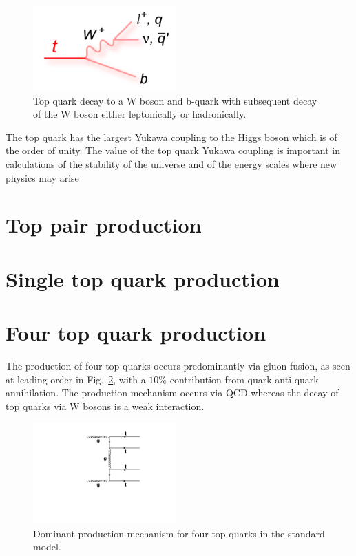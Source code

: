 \begin{figure}[ht!]
\begin{center}
    \includegraphics[width=0.49\textwidth]{images/Theory/topdecay.png}
    \caption{Top quark decay to a W boson and b-quark with subsequent decay of the W boson either leptonically or hadronically.}
    \label{fig:tdecay}
\end{center}
\end{figure}

The top quark has the largest Yukawa coupling to the Higgs boson which is of the order of unity. The value of the top quark Yukawa coupling is important in calculations of the stability of the universe and of the energy scales where new physics may arise~\cite{Bezrukov:2014ina}

\section{Top pair production}

\section{Single top quark production}


\section{Four top quark production}

The production of four top quarks occurs predominantly via gluon fusion, as seen at leading order in Fig.~\ref{fig:ttttAtLO}, with a $10\%$ contribution from quark-anti-quark annihilation. The production mechanism occurs via QCD whereas the decay of top quarks via W bosons is a weak interaction. 

\begin{figure}[ht!]
\begin{center}
    \includegraphics[width=0.49\textwidth]{images/Theory/tttt_t_LO.pdf}
    \caption{Dominant production mechanism for four top quarks in the standard model.}
    \label{fig:ttttAtLO}
\end{center}
\end{figure}

